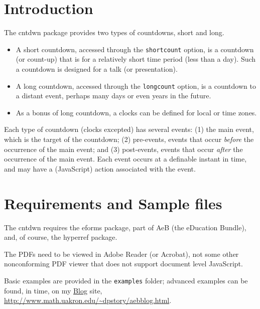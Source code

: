 \documentclass{article}
\begin{document}
\maketitle

\tableofcontents
{}

\section{Introduction}\label{s:intro}

The \textsf{cntdwn} package provides two types of countdowns, short and
long.
\begin{itemize}
    \item A short countdown, accessed through the \texttt{shortcount}
    option, is a countdown (or count-up) that is for a relatively short time
    period (less than a day). Such a countdown is designed for a talk (or
    presentation).
    \item A long countdown, accessed through the \texttt{longcount}
    option, is a countdown to a distant event, perhaps many days or even
    years in the future.
    \item As a bonus of long countdown, a clocks can be defined for local
    or time zones.
\end{itemize}
Each type of countdown (clocks excepted) has several events: (1) the main event, which is the
target of the countdown; (2) pre-events, events that occur \textit{before} the
occurrence of the main event; and (3) post-events, events that occur \textit{after} the
occurrence of the main event. Each event occurs at a definable instant in
time, and may have a (JavaScript) action associated with the event.

\section{Requirements and Sample files}

The \textsf{cntdwn} requires the \textsf{eforms} package, part of AeB (the
{\AcroTeX} eDucation Bundle), and, of course, the \textsf{hyperref} package.

The PDFs need to be viewed in Adobe Reader (or Acrobat), not some other nonconforming
PDF viewer that does not support document level JavaScript.

Basic examples are provided in the \texttt{examples} folder; advanced
examples can be found, in time, on my \href{http://www.math.uakron.edu/~dpstory/aebblog.html}{{\AEB} Blog} site,
\url{http://www.math.uakron.edu/~dpstory/aebblog.html}.
\end{document}
